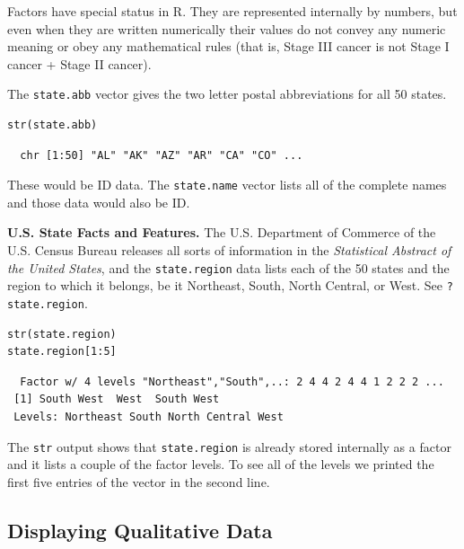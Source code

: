 \documentclass[captions=tableheading]{scrbook}
\begin{document}
Factors have special status in \textsf{R}. They are represented internally by numbers, but even when they are written numerically their values do not convey any numeric meaning or obey any mathematical rules (that is, Stage III cancer is not Stage I cancer + Stage II cancer).

\begin{example}
The \texttt{state.abb}
vector gives the two letter postal abbreviations for all 50 states.


\begin{verbatim}
str(state.abb)
\end{verbatim}

\begin{verbatim}
  chr [1:50] "AL" "AK" "AZ" "AR" "CA" "CO" ...
\end{verbatim}

These would be ID data. The \texttt{state.name} vector lists all of the complete names and those data would also be ID.
\end{example}

\begin{example}
\textbf{U.S. State Facts and Features.} The U.S. Department of Commerce of the U.S. Census Bureau releases all sorts of information in the \emph{Statistical Abstract of the United States}, and the \texttt{state.region} data lists each of the 50 states and the region to which it belongs, be it Northeast, South, North Central, or West. See \texttt{?state.region}.


\begin{verbatim}
str(state.region)
state.region[1:5]
\end{verbatim}

\begin{verbatim}
  Factor w/ 4 levels "Northeast","South",..: 2 4 4 2 4 4 1 2 2 2 ...
 [1] South West  West  South West 
 Levels: Northeast South North Central West
\end{verbatim}

The \texttt{str} output shows that \texttt{state.region} is already stored internally as a factor and it lists a couple of the factor levels. To see all of the levels we printed the first five entries of the vector in the second line.
\end{example}
\subsection{Displaying Qualitative Data}
\label{sec-2-1-4}
\end{document}
